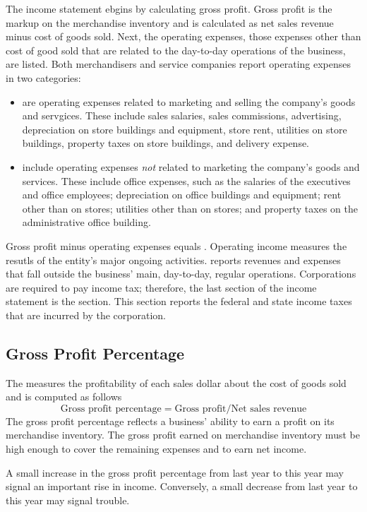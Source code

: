 \documentclass{article}
\begin{document}
The income statement ebgins by calculating gross profit. Gross profit is the markup on the merchandise inventory and is calculated as net sales revenue minus cost of goods sold. Next, the operating expenses, those expenses other than cost of good sold that are related to the day-to-day operations of the business, are listed. Both merchandisers and service companies report operating expenses in two categories: 
\begin{itemize}
  \item {} are operating expenses related to marketing and selling the company's goods and servgices. These include sales salaries, sales commissions, advertising, depreciation on store buildings and equipment, store rent, utilities on store buildings, property taxes on store buildings, and delivery expense. 
  \item {} include operating expenses \emph{not} related to marketing the company's goods and services. These include office expenses, such as the salaries of the executives and office employees; depreciation on office buildings and equipment; rent other than on stores; utilities other than on stores; and property taxes on the administrative office building. 
\end{itemize}

Gross profit minus operating expenses equals . Operating income measures the resutls of the entity's major ongoing activities.  reports revenues and expenses that fall outside the business' main, day-to-day, regular operations. Corporations are required to pay income tax; therefore, the last section of the income statement is the  section. This section reports the federal and state income taxes that are incurred by the corporation. 

\subsection{Gross Profit Percentage}

The  measures the profitability of each sales dollar about the cost of goods sold and is computed as follows $$\textrm{Gross profit percentage} = \textrm{Gross profit} / \textrm{Net sales revenue}$$ The gross profit percentage reflects a business' ability to earn a profit on its merchandise inventory. The gross profit earned on merchandise inventory must be high enough to cover the remaining expenses and to earn net income. 

\begin{remark}
  A small increase in the gross profit percentage from last year to this year may signal an important rise in income. Conversely, a small decrease from last year to this year may signal trouble. 
\end{remark}
\end{document}
